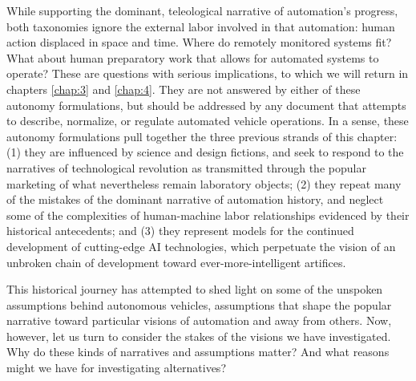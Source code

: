 While supporting the dominant, teleological narrative of automation's
progress, both
taxonomies ignore the external labor involved in that automation:
human action displaced in space and time. Where do remotely monitored
systems fit? What about human preparatory work that allows for
automated systems to operate? These are questions with serious
implications, to which we will
return in chapters \ref{chap:3} and \ref{chap:4}. They are not
answered by either of these autonomy formulations, but should be
addressed by any document that attempts to describe, normalize, or
regulate automated vehicle operations. In a sense, these autonomy
formulations pull together the three previous strands of this
chapter: (1) they are influenced by science and design fictions, and seek
to respond to the narratives of technological revolution as
transmitted through the popular marketing of what nevertheless remain laboratory
objects; (2) they repeat many of the mistakes of the dominant narrative of
automation history, and neglect some of the complexities of
human-machine labor relationships evidenced by their historical
antecedents; and (3) they represent models for the
continued development of cutting-edge AI technologies, which perpetuate
the vision of an unbroken chain of development toward
ever-more-intelligent artifices. 

This historical journey has attempted
to shed light on some of the unspoken assumptions behind autonomous
vehicles, assumptions that shape the popular narrative toward
particular visions of automation and away from others. Now, however,
let us turn to consider the stakes of the 
visions we have investigated. Why do these kinds of narratives and
assumptions matter? And what 
reasons might we have for investigating alternatives?




